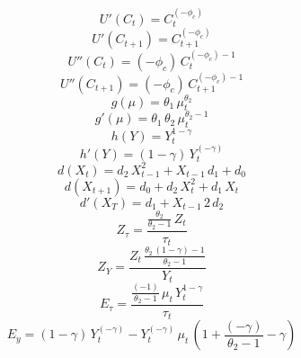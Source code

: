 \begin{dmath*}
{U'(C_t)} = {{C}}_{t}^{\left(-{{\phi_c}}\right)}
\end{dmath*}
\begin{dmath*}
{U'(C_{t+1})} = {{C}}_{t+1}^{\left(-{{\phi_c}}\right)}
\end{dmath*}
\begin{dmath*}
{U''(C_t)} = \left(-{{\phi_c}}\right)\, {{C}}_{t}^{\left(-{{\phi_c}}\right)-1}
\end{dmath*}
\begin{dmath*}
{U''(C_{t+1})} = \left(-{{\phi_c}}\right)\, {{C}}_{t+1}^{\left(-{{\phi_c}}\right)-1}
\end{dmath*}
\begin{dmath*}
g(\mu) = {{\theta_1}}\, {{\mu}}_{t}^{{{\theta_2}}}
\end{dmath*}
\begin{dmath*}
g'(\mu) = {{\theta_1}}\, {{\theta_2}}\, {{\mu}}_{t}^{{{\theta_2}}-1}
\end{dmath*}
\begin{dmath*}
{h(Y)} = {{Y}}_{t}^{1-{{\gamma}}}
\end{dmath*}
\begin{dmath*}
{h'(Y)} = \left(1-{{\gamma}}\right)\, {{Y}}_{t}^{\left(-{{\gamma}}\right)}
\end{dmath*}
\begin{dmath*}
{d(X_t)} = {{d_2}}\, {{X}}_{t-1}^{2}+{{X}}_{t-1}\, {{d_1}}+{{d_0}}
\end{dmath*}
\begin{dmath*}
{d(X_{t+1})} = {{d_0}}+{{d_2}}\, {{X}}_{t}^{2}+{{d_1}}\, {{X}}_{t}
\end{dmath*}
\begin{dmath*}
{d'(X_T)} = {{d_1}}+{{X}}_{t-1}\, 2\, {{d_2}}
\end{dmath*}
\begin{dmath*}
{Z_\tau} = \frac{\frac{{{\theta_2}}}{{{\theta_2}}-1}\, {{Z}}_{t}}{{{\tau}}_{t}}
\end{dmath*}
\begin{dmath*}
{Z_Y} = \frac{{{Z}}_{t}\, \frac{{{\theta_2}}\, \left(1-{{\gamma}}\right)-1}{{{\theta_2}}-1}}{{{Y}}_{t}}
\end{dmath*}
\begin{dmath*}
{E_\tau} = \frac{\frac{\left(-1\right)}{{{\theta_2}}-1}\, {{\mu}}_{t}\, {{Y}}_{t}^{1-{{\gamma}}}}{{{\tau}}_{t}}
\end{dmath*}
\begin{dmath*}
{E_y} = \left(1-{{\gamma}}\right)\, {{Y}}_{t}^{\left(-{{\gamma}}\right)}-{{Y}}_{t}^{\left(-{{\gamma}}\right)}\, {{\mu}}_{t}\, \left(1+\frac{\left(-{{\gamma}}\right)}{{{\theta_2}}-1}-{{\gamma}}\right)
\end{dmath*}
